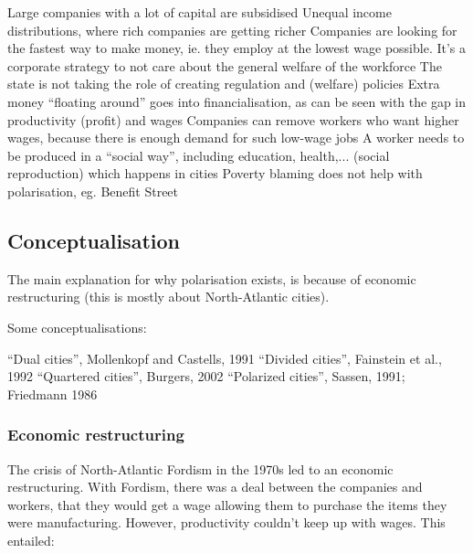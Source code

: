 \documentclass{article}
\begin{document}
\begin{outline}
	\1 Large companies with a lot of capital are subsidised
	\1 Unequal income distributions, where rich companies are getting richer
	\1 Companies are looking for the fastest way to make money, ie. they employ at the lowest wage possible. It's a corporate strategy to not care about the general welfare of the workforce
	\1 The state is not taking the role of creating regulation and (welfare) policies
	\1 Extra money ``floating around'' goes into financialisation, as can be seen with the gap in productivity (profit) and wages 
	\1 Companies can remove workers who want higher wages, because there is enough demand for such low-wage jobs
	\1 A worker needs to be produced in a ``social way'', including education, health,... (social reproduction) which happens in cities
	\1 Poverty blaming does not help with polarisation, eg. Benefit Street
\end{outline}

\subsection{Conceptualisation}

The main explanation for why polarisation exists, is because of economic restructuring (this is mostly about North-Atlantic cities).

Some conceptualisations:
\begin{outline}
	\1 ``Dual cities'', Mollenkopf and Castells, 1991
	\1 ``Divided cities'', Fainstein et al., 1992
	\1 ``Quartered cities'', Burgers, 2002
	\1 ``Polarized cities'', Sassen, 1991; Friedmann 1986
\end{outline}

\subsubsection{Economic restructuring}

The crisis of North-Atlantic Fordism in the 1970s led to an economic restructuring. With Fordism, there was a deal between the companies and workers, that they would get a wage allowing them to purchase the items they were manufacturing. However, productivity couldn't keep up with wages. This entailed:
\end{document}
